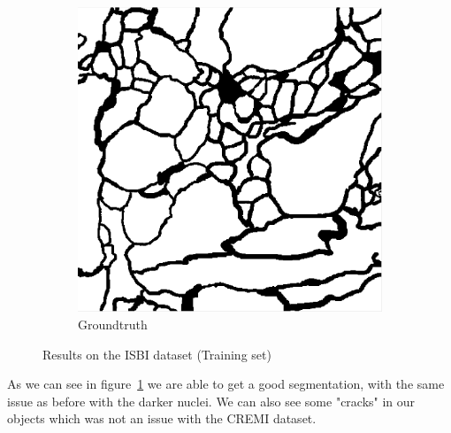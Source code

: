 \begin{figure}[!htbp]
\begin{subfigure}[t]{0.31\textwidth}
        \centering
        \includegraphics[height=0.7\textwidth]{./images/isbi_gt_1.png}
        \caption{Groundtruth}
    \end{subfigure}
	\caption{Results on the ISBI dataset (Training set)}
	\label{fig:isbi_result_train}
\end{figure}

As we can see in figure~\ref{fig:isbi_result_train} we are able to get a good
segmentation, with the same issue as before with the darker nuclei. We can also
see some "cracks" in our objects which was not an issue with the CREMI dataset.


